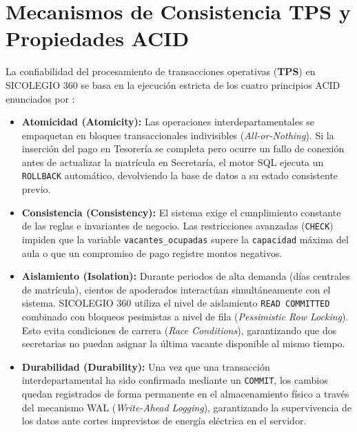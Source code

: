 \documentclass[12pt,a4paper,oneside]{report}
\begin{document}
\section{Mecanismos de Consistencia TPS y Propiedades ACID}

La confiabilidad del procesamiento de transacciones operativas (\textbf{TPS}) en SICOLEGIO 360 se basa en la ejecución estricta de los cuatro principios ACID enunciados por \citet{silberschatz2020}:

\begin{itemize}
    \item \textbf{Atomicidad (Atomicity):} Las operaciones interdepartamentales se empaquetan en bloques transaccionales indivisibles (\textit{All-or-Nothing}). Si la inserción del pago en Tesorería se completa pero ocurre un fallo de conexión antes de actualizar la matrícula en Secretaría, el motor SQL ejecuta un \texttt{ROLLBACK} automático, devolviendo la base de datos a su estado consistente previo.
    \item \textbf{Consistencia (Consistency):} El sistema exige el cumplimiento constante de las reglas e invariantes de negocio. Las restricciones avanzadas (\texttt{CHECK}) impiden que la variable \texttt{vacantes\_ocupadas} supere la \texttt{capacidad} máxima del aula o que un compromiso de pago registre montos negativos.
    \item \textbf{Aislamiento (Isolation):} Durante periodos de alta demanda (días centrales de matrícula), cientos de apoderados interactúan simultáneamente con el sistema. SICOLEGIO 360 utiliza el nivel de aislamiento \texttt{READ COMMITTED} combinado con bloqueos pesimistas a nivel de fila (\textit{Pessimistic Row Locking}). Esto evita condiciones de carrera (\textit{Race Conditions}), garantizando que dos secretarias no puedan asignar la última vacante disponible al mismo tiempo.
    \item \textbf{Durabilidad (Durability):} Una vez que una transacción interdepartamental ha sido confirmada mediante un \texttt{COMMIT}, los cambios quedan registrados de forma permanente en el almacenamiento físico a través del mecanismo WAL (\textit{Write-Ahead Logging}), garantizando la supervivencia de los datos ante cortes imprevistos de energía eléctrica en el servidor.
\end{itemize}

\end{document}
